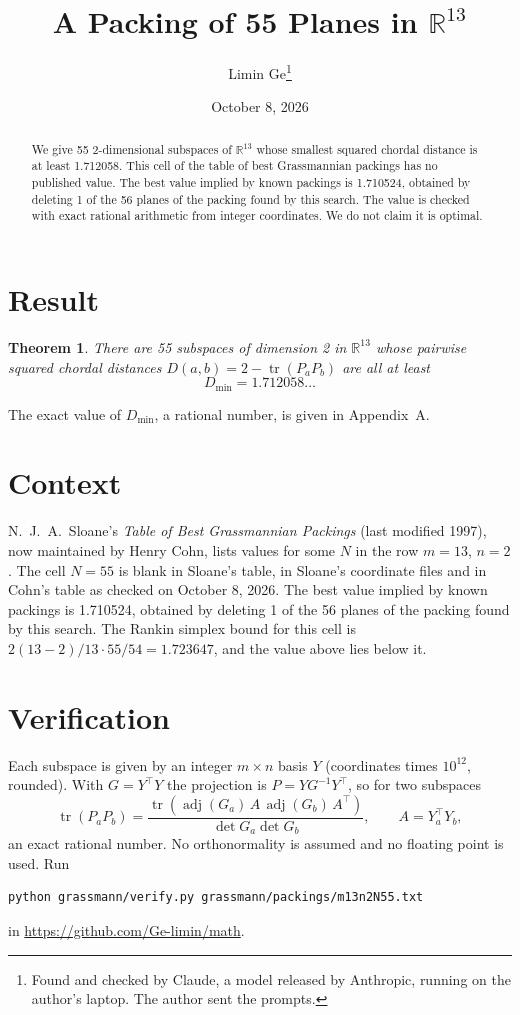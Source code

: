 \documentclass[11pt,a4paper]{article}
\title{A Packing of 55 Planes in $\mathbb{R}^{13}$}
\author{Limin Ge\thanks{Found and checked by Claude, a model released by Anthropic, running on the author's laptop. The author sent the prompts.}}
\date{October 8, 2026}
\newtheorem*{theorem}{Theorem}
\begin{document}
\maketitle
\begin{abstract}
We give 55 2-dimensional subspaces of $\mathbb{R}^{13}$ whose smallest squared chordal distance is at least 1.712058. This cell of the table of best Grassmannian packings has no published value. The best value implied by known packings is 1.710524, obtained by deleting 1 of the 56 planes of the packing found by this search. The value is checked with exact rational arithmetic from integer coordinates. We do not claim it is optimal.
\end{abstract}

\section{Result}
\begin{theorem}
There are 55 subspaces of dimension 2 in $\mathbb{R}^{13}$ whose pairwise squared chordal distances $D(a,b) = 2 - \operatorname{tr}(P_aP_b)$ are all at least
\[ D_{\min} = 1.712058\ldots \]
\end{theorem}
The exact value of $D_{\min}$, a rational number, is given in Appendix~A.


\section{Context}
N.~J.~A.~Sloane's \emph{Table of Best Grassmannian Packings} (last modified 1997), now maintained by Henry Cohn, lists values for some $N$ in the row $m=13$, $n=2$. The cell $N=55$ is blank in Sloane's table, in Sloane's coordinate files and in Cohn's table as checked on October 8, 2026. The best value implied by known packings is 1.710524, obtained by deleting 1 of the 56 planes of the packing found by this search. The Rankin simplex bound for this cell is $2(13-2)/13\cdot 55/54 = 1.723647$, and the value above lies below it.


\section{Verification}
Each subspace is given by an integer $m\times n$ basis $Y$ (coordinates times $10^{12}$, rounded). With $G=Y^\top Y$ the projection is $P=YG^{-1}Y^\top$, so for two subspaces
\[ \operatorname{tr}(P_aP_b)=\frac{\operatorname{tr}(\operatorname{adj}(G_a)\,A\,\operatorname{adj}(G_b)\,A^\top)}{\det G_a\det G_b},\qquad A=Y_a^\top Y_b, \]
an exact rational number. No orthonormality is assumed and no floating point is used. Run
\begin{verbatim}
python grassmann/verify.py grassmann/packings/m13n2N55.txt
\end{verbatim}
in \url{https://github.com/Ge-limin/math}.
\end{document}

